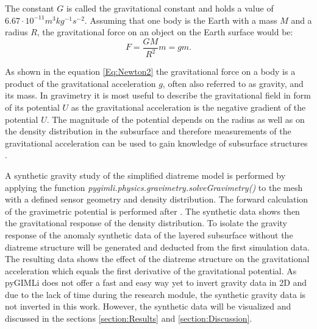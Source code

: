 The constant $G$ is called the gravitational constant and holds a value of $6.67\cdot10^{-11}m^{3}kg^{-1}s^{-2}$. Assuming that one body is the Earth with a mass $M$ and a radius $R$, the gravitational force on an object on the Earth surface would be:
\begin{equation}
    F = \frac{GM}{R^2}m = gm.
    \label{Eq:Newton2}
\end{equation}

As shown in the equation \ref{Eq:Newton2} the gravitational force on a body is a product of the gravitational acceleration $g$, often also referred to as gravity, and its mass. In gravimetry it is most useful to describe the gravitational field in form of its potential $U$ as the gravitational acceleration is the negative gradient of the potential $U$. The magnitude of the potential depends on the radius as well as on the density distribution in the subsurface and therefore measurements of the gravitational acceleration can be used to gain knowledge of subsurface structures \citep{kearey2002introduction}.

A synthetic gravity study of the simplified diatreme model is performed by applying the function \textit{pygimli.physics.gravimetry.solveGravimetry()} to the mesh with a defined sensor geometry and density distribution. The forward calculation of the gravimetric potential is performed after \citet{won1987computing}. The synthetic data shows then the gravitational response of the density distribution. To isolate the gravity response of the anomaly synthetic data of the layered subsurface without the diatreme structure will be generated and deducted from the first simulation data. The resulting data shows the effect of the diatreme structure on the gravitational acceleration which equals the first derivative of the gravitational potential. As pyGIMLi does not offer a fast and easy way yet to invert gravity data in 2D and due to the lack of time during the research module, the synthetic gravity data is not inverted in this work. However, the synthetic data will be visualized and discussed in the sections \ref{section:Results} and \ref{section:Discussion}.

